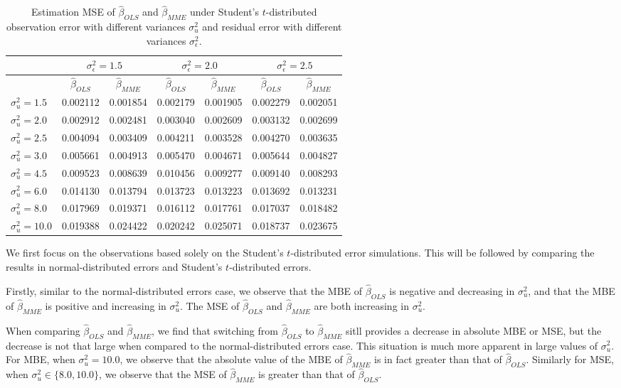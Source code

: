 \documentclass{article}
\begin{document}
\begin{table}[ht]
    \centering
    \caption{Estimation MSE of $\hat{\beta}_{OLS}$ and $\hat{\beta}_{MME}$ under Student's $t$-distributed observation error with different variances $\sigma^2_u$ and residual error with different variances $\sigma^2_\epsilon$.}
    \label{Tab:MSE_t}
    \begin{tabular}[t]{lcccccc}
        \hline
        &\multicolumn{2}{c}{$\sigma^2_\epsilon=1.5$}&\multicolumn{2}{c}{$\sigma^2_\epsilon=2.0$}&\multicolumn{2}{c}{$\sigma^2_\epsilon=2.5$}\\
        \hline
        &$\hat{\beta}_{OLS}$&$\hat{\beta}_{MME}$&$\hat{\beta}_{OLS}$&$\hat{\beta}_{MME}$&$\hat{\beta}_{OLS}$&$\hat{\beta}_{MME}$\\
        \hline
        $\sigma^2_u = 1.5$&0.002112&0.001854&0.002179&0.001905&0.002279&0.002051\\
        $\sigma^2_u = 2.0$&0.002912&0.002481&0.003040&0.002609&0.003132&0.002699\\
        $\sigma^2_u = 2.5$&0.004094&0.003409&0.004211&0.003528&0.004270&0.003635\\
        $\sigma^2_u = 3.0$&0.005661&0.004913&0.005470&0.004671&0.005644&0.004827\\
        $\sigma^2_u = 4.5$&0.009523&0.008639&0.010456&0.009277&0.009140&0.008293\\
        $\sigma^2_u = 6.0$&0.014130&0.013794&0.013723&0.013223&0.013692&0.013231\\
        $\sigma^2_u = 8.0$&0.017969&0.019371&0.016112&0.017761&0.017037&0.018482\\
        $\sigma^2_u = 10.0$&0.019388&0.024422&0.020242&0.025071&0.018737&0.023675\\
        \hline
    \end{tabular}
\end{table}

We first focus on the observations based solely on the Student's $t$-distributed error simulations. This will be followed by comparing the results in normal-distributed errors and Student's $t$-distributed errors. 

Firstly, similar to the normal-distributed errors case, we observe that the MBE of $\hat{\beta}_{OLS}$ is negative and decreasing in $\sigma^2_u$,
and that the MBE of $\hat{\beta}_{MME}$ is positive and increasing in $\sigma^2_u$.
The MSE of $\hat{\beta}_{OLS}$ and $\hat{\beta}_{MME}$ are both increasing in $\sigma^2_u$.

When comparing $\hat{\beta}_{OLS}$ and $\hat{\beta}_{MME}$,
we find that switching from $\hat{\beta}_{OLS}$ to $\hat{\beta}_{MME}$ sitll provides a decrease in absolute MBE or MSE,
but the decrease is not that large when compared to the normal-distributed errors case.
This situation is much more apparent in large values of $\sigma^2_u$.
For MBE, when $\sigma^2_u = 10.0$, we observe that the absolute value of the MBE of $\hat{\beta}_{MME}$ is in fact greater than that of $\hat{\beta}_{OLS}$.
Similarly for MSE, when $\sigma^2_u \in \{8.0, 10.0\}$, we observe that the MSE of $\hat{\beta}_{MME}$ is greater than that of $\hat{\beta}_{OLS}$.
\end{document}
